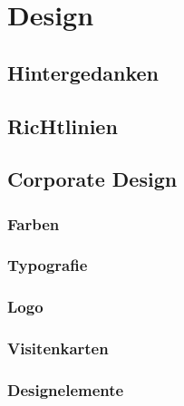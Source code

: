 \section{Design}
\subsection{Hintergedanken}
\subsection{RicHtlinien}
\subsection{Corporate Design}
\subsubsection{Farben}
\subsubsection{Typografie}
\subsubsection{Logo}
\subsubsection{Visitenkarten}
\subsubsection{Designelemente}
